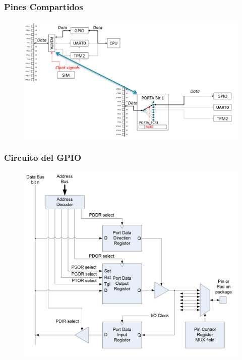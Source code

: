 \documentclass[10.5pt,scale=1.0,t,aspectratio=169,hyperref={pdfpagelabels=false}]{beamer}
\begin{document}
\begin{frame}
	\frametitle{Pines Compartidos}
		\begin{figure}
			\centering
			\includegraphics[scale=0.3]{06_GPIOShared}
		\end{figure}
\end{frame}
\begin{frame}
	\frametitle{Circuito del GPIO}
	\begin{figure}
		\centering
		\includegraphics[scale=0.3]{07_GPIOCircuit}
	\end{figure}
\end{frame}
\end{document}

